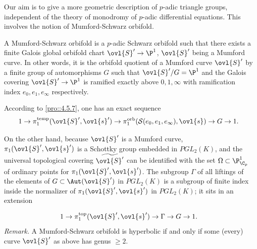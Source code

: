 \begin{para}\label{para::5.3.1} Our aim is to give a more geometric
 description of $p$-adic triangle groups, independent of the theory of
 monodromy of $p$-adic differential equations. This involves the notion
 of Mumford-Schwarz orbifold.
\end{para}

\begin{dfn}\label{def::5.3.2} A Mumford-Schwarz orbifold is a $p$-adic
 Schwarz orbifold such that there exists a finite 
Galois global orbifold chart $\ovl{S}' \to \P^1$, $\ovl{S}'$ being a
 Mumford curve.  
\hfill\break In other
words, it is the orbifold quotient of a Mumford curve $\ovl{S}'$ by a
 finite group of automorphisms $G$ such that $\ovl{S}'/G= \P^1$ and the
Galois covering $\ovl{S}' \to \P^1$ is ramified exactly above $0,
1,\infty$ with ramification index $e_0,e_1,e_\infty$ respectively.
\end{dfn}

\medskip\noindent According to \ref{pro::4.5.7}, one has an exact sequence
\begin{equation*}
1\to \pi_1^{\mathrm{temp}}(\ovl{S}',\ovl{s}')\to
 \pi_1^{\mathrm{orb}}(\mathcal{S}(e_0,e_1,e_\infty),\ovl{s}) \to G \to 1. 
\end{equation*}

\noindent On the other hand, because $\ovl{S}'$ is a Mumford curve,
$\pi_1(\ovl{S}',\ovl{s}')$ is a Schottky group embedded in 
$PGL_2(K) $, and the universal topological covering
$\widetilde{\ovl{S}'}$ can be 
identified with the set $\Omega\subset \P^1_{\C_p}$ of ordinary points
for $\pi_1(\ovl{S}',\ovl{s}')$. The subgroup  
$\Gamma$ of all liftings of the elements of $G \subset \Aut (\ovl{S}')$
in $PGL_2(K)$ is a subgroup of finite index inside 
the normalizer of
$\pi_1(\ovl{S}',\ovl{s}')$ in $PGL_2(K)$; it sits in an extension 

\begin{equation*}
 1\to \pi_1^{\mathrm{top}}(\ovl{S}',\ovl{s}')\to \Gamma \to G \to 1.
\end{equation*}
{\it Remark.} A Mumford-Schwarz orbifold is hyperbolic if and only if some (\resp every) curve $\ovl{S}'$
as above has genus $\geq 2$. 

